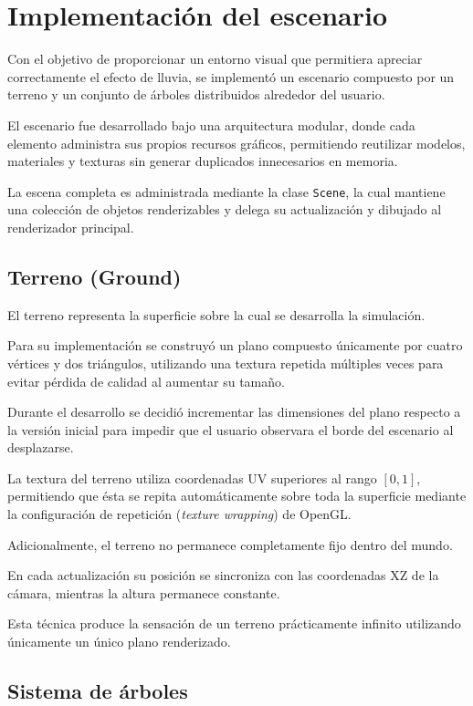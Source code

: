 \section{Implementación del escenario}

Con el objetivo de proporcionar un entorno visual que permitiera apreciar correctamente el efecto de lluvia, se implementó un escenario compuesto por un terreno y un conjunto de árboles distribuidos alrededor del usuario.

El escenario fue desarrollado bajo una arquitectura modular, donde cada elemento administra sus propios recursos gráficos, permitiendo reutilizar modelos, materiales y texturas sin generar duplicados innecesarios en memoria.

La escena completa es administrada mediante la clase \texttt{Scene}, la cual mantiene una colección de objetos renderizables y delega su actualización y dibujado al renderizador principal.

\subsection{Terreno (Ground)}

El terreno representa la superficie sobre la cual se desarrolla la simulación.

Para su implementación se construyó un plano compuesto únicamente por cuatro vértices y dos triángulos, utilizando una textura repetida múltiples veces para evitar pérdida de calidad al aumentar su tamaño.

Durante el desarrollo se decidió incrementar las dimensiones del plano respecto a la versión inicial para impedir que el usuario observara el borde del escenario al desplazarse.

La textura del terreno utiliza coordenadas UV superiores al rango $[0,1]$, permitiendo que ésta se repita automáticamente sobre toda la superficie mediante la configuración de repetición (\textit{texture wrapping}) de OpenGL.

Adicionalmente, el terreno no permanece completamente fijo dentro del mundo.

En cada actualización su posición se sincroniza con las coordenadas XZ de la cámara, mientras la altura permanece constante.

Esta técnica produce la sensación de un terreno prácticamente infinito utilizando únicamente un único plano renderizado.

\subsection{Sistema de árboles}

